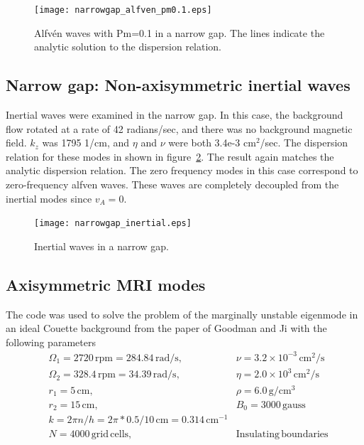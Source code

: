 \documentclass[letterpaper]{article}
\begin{document}
\begin{figure}
\begin{center}
\texttt{[image: narrowgap\_alfven\_pm0.1.eps]}
\caption{Alfv\'en waves with Pm=0.1 in a narrow gap.  The lines
  indicate the analytic solution to the dispersion relation.}
\label{fig:narrowgapalfvenpm0.1}
\end{center}
\end{figure}

\subsection{Narrow gap: Non-axisymmetric inertial waves}
Inertial waves were examined in the narrow gap.  In this case, the
background flow rotated at a rate of 42 radians/sec, and there was no
background magnetic field.  $k_z$ was 1795 1/cm, and $\eta$ and $\nu$
were both 3.4e-3 cm$^2$/sec.  The dispersion relation for these modes
in shown in figure~\ref{fig:narrowgapinertial}.  The result again
matches the analytic dispersion relation.  The zero frequency modes in
this case correspond to zero-frequency alfven waves.  These waves are
completely decoupled from the inertial modes since $v_{A}=0$.

\begin{figure}
\begin{center}
\texttt{[image: narrowgap\_inertial.eps]}
\caption{Inertial waves in a narrow gap.}
\label{fig:narrowgapinertial}
\end{center}
\end{figure}

\subsection{Axisymmetric MRI modes}

The code was used to solve the problem of the marginally unstable
eigenmode in an ideal Couette background from the paper of Goodman and
Ji with the following parameters
\begin{align*}
&\Omega_1 = 2720\,\mathrm{rpm} = 284.84\,\mathrm{rad/s},\quad
    &\nu = 3.2\times10^{-3}\,\mathrm{cm^2/s}
\\
&\Omega_2 = 328.4\,\mathrm{rpm} = 34.39\,\mathrm{rad/s},\quad
    &\eta = 2.0\times10^{3}\,\mathrm{cm^2/s}
\\
&r_1 = 5\,\mathrm{cm},\quad &\rho = 6.0\,\mathrm{g/cm^3}
\\
&r_2 = 15\,\mathrm{cm},\quad &B_0 = 3000\, \mathrm{gauss}
\\
&k = 2\pi n/h = 2\pi*0.5/10\,\mathrm{cm} = 0.314\,\mathrm{cm^{-1}}
\\
&N = 4000\,\mathrm{grid\,cells},\quad &\mathrm{Insulating\,boundaries}
\end{align*}
\end{document}

